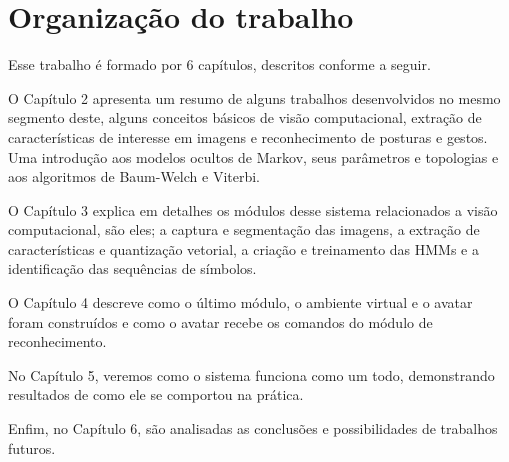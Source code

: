 \section{Organização do trabalho}

Esse trabalho é formado por 6 capítulos, descritos conforme a seguir.

O Capítulo 2 apresenta um resumo de alguns trabalhos desenvolvidos no mesmo segmento deste, alguns conceitos básicos de visão computacional, extração de características de interesse em imagens e reconhecimento de posturas e gestos. Uma introdução aos modelos ocultos de Markov, seus parâmetros e topologias e aos algoritmos de Baum-Welch e Viterbi.

O Capítulo 3 explica em detalhes os módulos desse sistema relacionados a visão computacional, são eles; a captura e segmentação das imagens, a extração de características e quantização vetorial, a criação e treinamento das HMMs e a identificação das sequências de símbolos.

O Capítulo 4 descreve como o último módulo, o ambiente virtual e o avatar foram construídos e como o avatar recebe os comandos do módulo de reconhecimento.

No Capítulo 5, veremos como o sistema funciona como um todo, demonstrando resultados de como ele se comportou na prática.

Enfim, no Capítulo 6, são analisadas as conclusões e possibilidades de trabalhos futuros.

